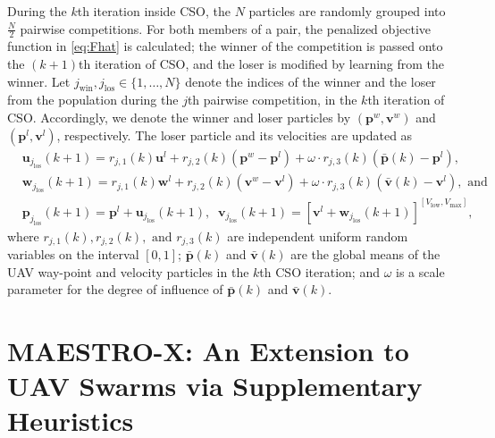 \documentclass[12pt, draftcls, onecolumn]{IEEEtran}
\theoremstyle{plain}
\theoremstyle{definition}
\theoremstyle{remark}
\begin{document}
During the $k$th iteration inside CSO, the $N$ particles are randomly grouped into $\frac{N}{2}$ pairwise competitions. For both members of a pair, the penalized objective function in \eqref{eq:Fhat} is calculated; the winner of the competition is passed onto the $(k{+}1)$th iteration of CSO, and the loser is modified by learning from the winner. Let $j_{\mathrm{win}}, j_{\mathrm{los}}{\in}\{1,{\dots},N\}$ denote the indices of the winner and the loser from the population during the $j$th pairwise competition, in the $k$th iteration of CSO. Accordingly, we denote the winner and loser particles by $(\mathbf{p}^{w},\mathbf{v}^{w})$ and $(\mathbf{p}^{l},\mathbf{v}^{l})$, respectively. The loser particle and its velocities are updated as
\begin{align}
	&\mathbf u_{j_{\mathrm{los}}} (k+1) = r_{j,1} (k) \mathbf u^l + r_{j,2}(k) \left( \mathbf p^w - \mathbf p^l \right) + \omega \cdot r_{j,3}(k) \left( \bar{\mathbf p}(k) - \mathbf p^l \right),\label{eq:UpdtU}\\
	&\mathbf w_{j_{\mathrm{los}}} (k+1) = r_{j,1} (k) \mathbf w^l + r_{j,2}(k) \left( \mathbf v^w - \mathbf v^l \right) + \omega \cdot r_{j,3}(k) \left( \bar{\mathbf v}(k) - \mathbf v^l \right),\text{ and }\label{eq:UpdtW}\\
	&\mathbf p_{j_{\mathrm{los}}} (k+1) = \mathbf p^l + \mathbf u_{j_{\mathrm{los}}} (k+1), \;\; \mathbf v_{j_{\mathrm{los}}} (k+1) = \left[ \mathbf v^l + \mathbf w_{j_{\mathrm{los}}} (k+1) \right]^{[V_{\mathrm{low}},V_{\mathrm{max}}]},\label{eq:UpdtPV}
\end{align}
where $r_{j,1}(k),r_{j,2}(k),\text{ and }r_{j,3}(k)$ are independent uniform random variables on the interval $[0,1]$; $\bar{\mathbf{p}}(k)$ and $\bar{\mathbf{v}}(k)$ are the global means of the UAV way-point and velocity particles in the $k$th CSO iteration; and $\omega$ is a scale parameter for the degree of influence of $\bar{\mathbf{p}}(k)$ and $\bar{\mathbf{v}}(k)$.
\vspace{-4mm}


\section{MAESTRO-X: An Extension to UAV Swarms via Supplementary Heuristics}\label{S5}
\vspace{-2mm}
\end{document}
